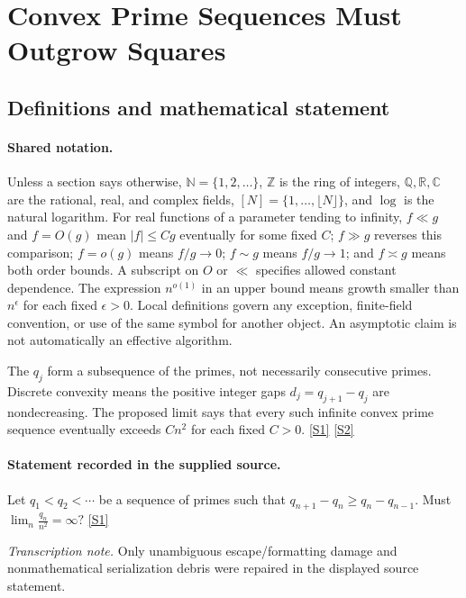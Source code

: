 \documentclass[11pt,a4paper]{article}
\newcommand{\N}{\mathbb{N}}
\newcommand{\Z}{\mathbb{Z}}
\newcommand{\Q}{\mathbb{Q}}
\newcommand{\R}{\mathbb{R}}
\newcommand{\C}{\mathbb{C}}
\newcommand{\sref}[2]{\hyperlink{source:#1:#2}{[S#2]}}
\begin{document}
\section{Convex Prime Sequences Must Outgrow Squares}\label{statement}


\subsection{Definitions and mathematical statement}

\paragraph{Shared notation.}Unless a section says otherwise, $\N=\{1,2,\ldots\}$,
$\Z$ is the ring of integers, $\Q,\R,\C$ are the rational, real, and complex
fields, $[N]=\{1,\ldots,\lfloor N\rfloor\}$, and $\log$ is the natural
logarithm. For real functions of a parameter tending to infinity,
$f\ll g$ and $f=O(g)$ mean $|f|\leq Cg$ eventually for some fixed $C$;
$f\gg g$ reverses this comparison; $f=o(g)$ means $f/g\to0$;
$f\sim g$ means $f/g\to1$; and $f\asymp g$ means both order bounds.
A subscript on $O$ or $\ll$ specifies allowed constant dependence.
The expression $n^{o(1)}$ in an upper bound means growth smaller than
$n^\epsilon$ for each fixed $\epsilon>0$. Local definitions govern any
exception, finite-field convention, or use of the same symbol for another
object. An asymptotic claim is not automatically an effective algorithm.



The $q_j$ form a subsequence of the primes, not necessarily consecutive primes. Discrete convexity means the positive integer gaps $d_j=q_{j+1}-q_j$ are nondecreasing. The proposed limit says that every such infinite convex prime sequence eventually exceeds $C n^2$ for each fixed $C>0$. \sref{statement}{1} \sref{statement}{2}

\paragraph{Statement recorded in the supplied source.}
Let $q_1<q_2<\cdots$ be a sequence of primes such that $ q_{n+1}-q_n\geq q_n-q_{n-1}. $ Must $ \lim_n \frac{q_n}{n^2}=\infty? $ \sref{statement}{1}

{\small\emph{Transcription note.} Only unambiguous escape/formatting damage and nonmathematical serialization debris were repaired in the displayed source statement.}
\end{document}
